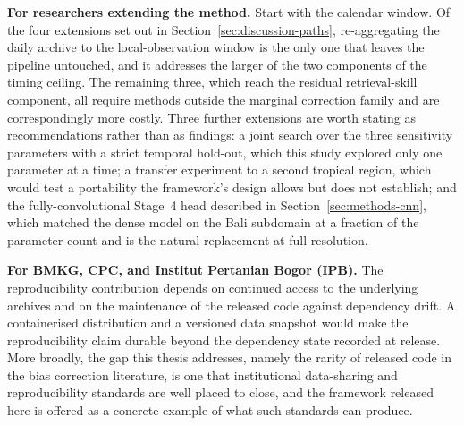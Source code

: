 \medskip\noindent\textbf{For researchers extending the method.}
Start with the calendar window. Of the four extensions set out in
Section~\ref{sec:discussion-paths}, re-aggregating the daily
archive to the local-observation window is the only one that
leaves the pipeline untouched, and it addresses the larger of the
two components of the timing ceiling. The remaining three, which
reach the residual retrieval-skill component, all require methods
outside the marginal correction family and are correspondingly
more costly. Three further extensions are worth stating as
recommendations rather than as findings: a joint search over the
three sensitivity parameters with a strict temporal hold-out,
which this study explored only one parameter at a time; a
transfer experiment to a second tropical region, which would test
a portability the framework's design allows but does not
establish; and the fully-convolutional Stage~4 head described in
Section~\ref{sec:methods-cnn}, which matched the dense model on
the Bali subdomain at a fraction of the parameter count and is
the natural replacement at full resolution.

\medskip\noindent\textbf{For BMKG, CPC, and Institut Pertanian Bogor (IPB).}
The reproducibility contribution depends on continued access to
the underlying archives and on the maintenance of the released
code against dependency drift. A containerised distribution and a
versioned data snapshot would make the reproducibility claim
durable beyond the dependency state recorded at release. More
broadly, the gap this thesis addresses, namely the rarity of
released code in the bias correction literature, is one that
institutional data-sharing and reproducibility standards are well
placed to close, and the framework released here is offered as a
concrete example of what such standards can produce.
